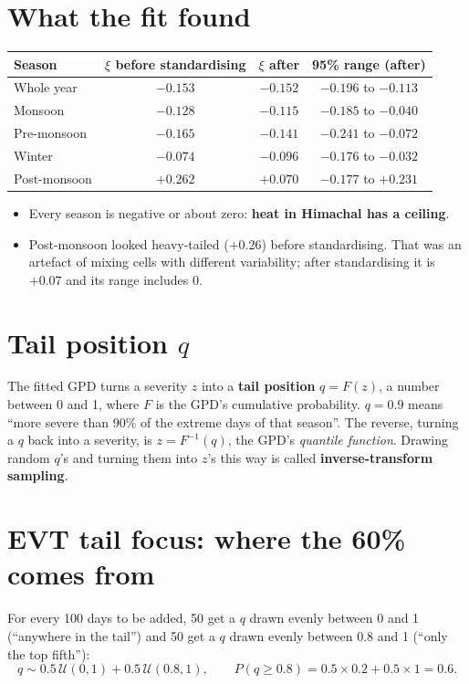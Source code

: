 \section{What the fit found}
\begin{center}
\footnotesize
\begin{tabular}{lccc}
\toprule
\textbf{Season} & \textbf{$\xi$ before standardising} & \textbf{$\xi$ after} & \textbf{95\% range (after)}\\
\midrule
Whole year & $-0.153$ & $-0.152$ & $-0.196$ to $-0.113$\\
Monsoon & $-0.128$ & $-0.115$ & $-0.185$ to $-0.040$\\
Pre-monsoon & $-0.165$ & $-0.141$ & $-0.241$ to $-0.072$\\
Winter & $-0.074$ & $-0.096$ & $-0.176$ to $-0.032$\\
Post-monsoon & $+0.262$ & $+0.070$ & $-0.177$ to $+0.231$\\
\bottomrule
\end{tabular}
\end{center}
\begin{itemize}
  \item Every season is negative or about zero: \textbf{heat in Himachal has a ceiling}.
  \item Post-monsoon looked heavy-tailed ($+0.26$) before standardising. That was an artefact of mixing cells with
        different variability; after standardising it is $+0.07$ and its range includes 0.
\end{itemize}

\section{Tail position $q$}
The fitted GPD turns a severity $z$ into a \textbf{tail position} $q=F(z)$, a number between 0 and 1, where $F$ is the
GPD's cumulative probability. $q=0.9$ means ``more severe than 90\% of the extreme days of that season''. The reverse,
turning a $q$ back into a severity, is $z=F^{-1}(q)$, the GPD's \emph{quantile function}. Drawing random $q$'s and
turning them into $z$'s this way is called \textbf{inverse-transform sampling}.

\section{EVT tail focus: where the 60\% comes from}
For every 100 days to be added, 50 get a $q$ drawn evenly between 0 and 1 (``anywhere in the tail'') and 50 get a $q$
drawn evenly between 0.8 and 1 (``only the top fifth''):
\[
  q\sim0.5\,\mathcal{U}(0,1)+0.5\,\mathcal{U}(0.8,1),\qquad
  P(q\ge0.8)=0.5\times0.2+0.5\times1=0.6 .
\]

